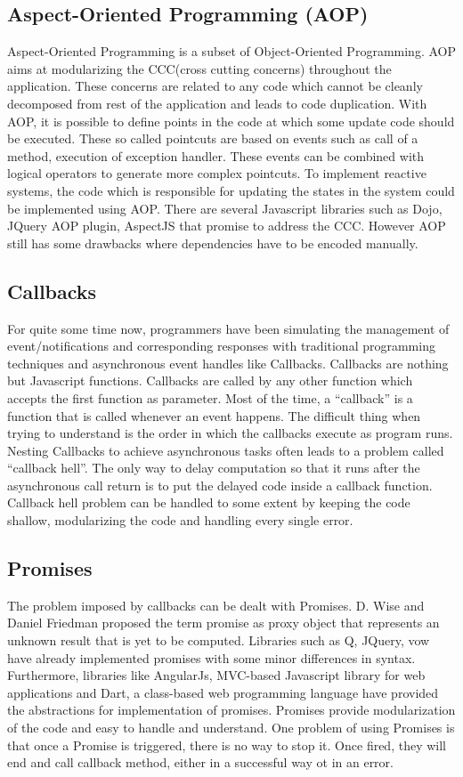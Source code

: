 \subsection{Aspect-Oriented Programming (AOP)}
Aspect-Oriented Programming is a subset of Object-Oriented Programming. 
AOP aims at modularizing the CCC(cross cutting concerns) throughout the application. 
These concerns are related to any code which cannot be cleanly decomposed from rest of the application and leads to code duplication. 
With AOP, it is possible to define points in the code at which some update code should be executed. 
These so called pointcuts are based on events such as call of a method, execution of exception handler. 
These events can be combined with logical operators to generate more complex pointcuts. 
To implement reactive systems, the code which is responsible for updating the states in the system could be implemented using AOP. 
There are several Javascript libraries such as Dojo, JQuery AOP plugin, AspectJS that promise to address the CCC. 
However AOP still has some drawbacks where dependencies have to be encoded manually.
\subsection{Callbacks}
For quite some time now, programmers have been simulating the management of event/notifications and corresponding responses with traditional programming techniques and asynchronous event handles like Callbacks. 
Callbacks are nothing but Javascript functions. 
Callbacks are called by any other function which accepts the first function as parameter. 
Most of the time, a ``callback'' is a function that is called whenever an event happens. 
The difficult thing when trying to understand is the order in which the callbacks execute as program runs. 
Nesting Callbacks to achieve asynchronous tasks often leads to a problem called ``callback hell''\cite{callbackHell}. 
The only way to delay computation so that it runs after the asynchronous call return is to put the delayed code inside a callback function.
Callback hell problem can be handled to some extent by keeping the code shallow, modularizing the code and handling every single error. 

\subsection{Promises}
The problem imposed by callbacks can be dealt with Promises. D. Wise and Daniel Friedman\cite{promiseKeyword} proposed the term promise as proxy object that represents an unknown result that is yet to be computed. 
Libraries such as Q, JQuery, vow have already implemented promises with some minor differences in syntax.
Furthermore, libraries like AngularJs\cite{angularjs}, MVC-based Javascript library for web applications and Dart, a class-based web programming language have provided the abstractions for implementation of promises. 
Promises provide modularization of the code and easy to handle and understand. 
One problem of using Promises is that once a Promise is triggered, there is no way to stop it. 
Once fired, they will end and call callback method, either in a successful way ot in an error.


